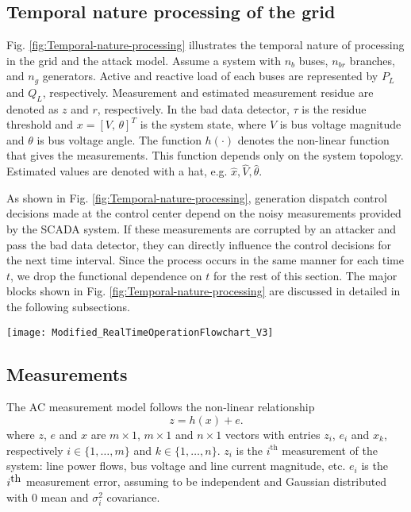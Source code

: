 \documentclass[twocolumn,english,final,journal]{IEEEtran}
\theoremstyle{plain}
\theoremstyle{definition}
\begin{document}
\subsection{Temporal nature processing of the grid}

Fig. \ref{fig:Temporal-nature-processing} illustrates the temporal
nature of processing in the grid and the attack model. Assume
a system with $n_{b}$ buses, $n_{br}$ branches, and $n_{g}$ generators.
Active and reactive load of each buses are represented by $P_{L}$
and $Q_{L}$, respectively. Measurement and estimated measurement
residue are denoted as $z$ and $r$, respectively. In the bad data
detector, $\tau$ is the residue threshold and $x=[V\mbox{, }\theta]^{T}$
is the system state, where $V$ is bus voltage magnitude and $\theta$
is bus voltage angle. The function $h(\cdot)$ denotes the non-linear
function that gives the measurements. This function depends only on the system
topology. Estimated values are denoted with a hat, e.g. $\hat{x},\hat{V},\hat{\theta}$.

As shown in Fig. \ref{fig:Temporal-nature-processing}, generation
dispatch control decisions made at the control center depend on the
noisy measurements provided by the SCADA system. If these measurements
are corrupted by an attacker and pass the bad data detector, 
they can directly influence the control decisions for the next time
interval. Since the process occurs in the same manner for each time
$t$, we drop the functional dependence on $t$ for the rest of this section.
The major blocks shown in Fig. \ref{fig:Temporal-nature-processing}
are discussed in detailed in the following subsections.

\begin{figure*}[tbh]
\centering{}
\texttt{[image: Modified\_RealTimeOperationFlowchart\_V3]}
\caption{Illustration of temporal processing of the grid and attack model.
\label{fig:Temporal-nature-processing}}
\end{figure*}


\subsection{Measurements}
The AC measurement model follows the non-linear relationship
\begin{equation}
z=h(x)+e\mbox{.}\label{Measurement_model}
\end{equation}
where $z$, $e$ and $x$ are $m\times1$, $m\times1$ and $n\times1$
vectors with entries $z_{i}$, $e_{i}$ and $x_{k}$, respectively
$i\in\{1,\ldots,m\}$ and $k\in\{1,\ldots,n\}$. $z_{i}$ is the $i^{\mbox{th}}$
measurement of the system: line power flows, bus voltage and line
current magnitude, etc. $e_{i}$ is the $i^{\mbox{\textrm{th}}}$
measurement error, assuming to be independent and Gaussian distributed
with $0$ mean and $\sigma_{i}^{2}$ covariance.
\end{document}
